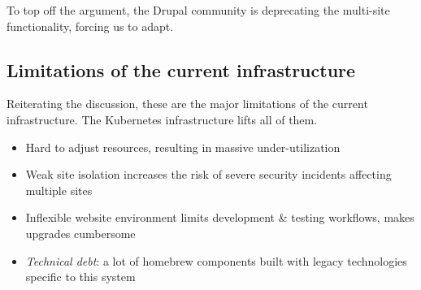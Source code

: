 To top off the argument, the Drupal community is deprecating the multi-site functionality, %
forcing us to adapt.

\subsection{Limitations of the current infrastructure}

Reiterating the discussion, these are the major limitations of the current infrastructure.
The Kubernetes infrastructure lifts all of them.

\begin{itemize}
    \item Hard to adjust resources, resulting in massive under-utilization
    \item Weak site isolation increases the risk of severe security incidents affecting multiple sites
    \item Inflexible website environment limits development \& testing workflows, makes upgrades cumbersome 
    \item \emph{Technical debt}: a lot of homebrew components built with legacy technologies specific to this system
\end{itemize}
